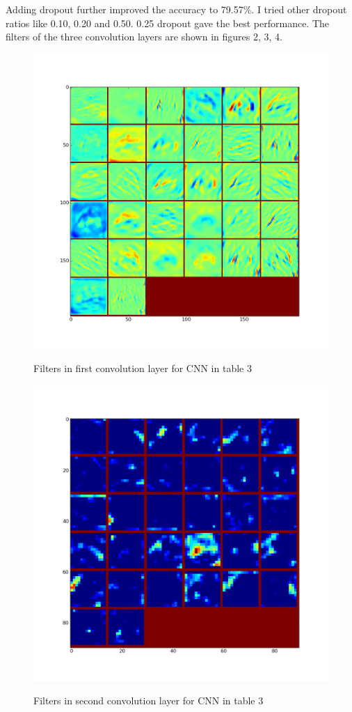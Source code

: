 \documentclass[10pt,twocolumn,letterpaper]{article}
\begin{document}
Adding dropout further improved the accuracy to 79.57\%. I tried other dropout ratios like 0.10, 0.20 and 0.50. 0.25 dropout gave the best performance. The filters of the three convolution layers are shown in figures 2, 3, 4.


\begin{figure}[hbt]

  \centering
  \includegraphics[scale=0.32]{d1}
  	\label{l1}
  \caption{Filters in first convolution layer for CNN in table 3}
\end{figure}
\begin{figure}[hbt]

  \centering
  \includegraphics[scale=0.32]{d2.png}
  \label{l2}
  \caption{Filters in second convolution layer for CNN in table 3}
\end{figure}
\end{document}

